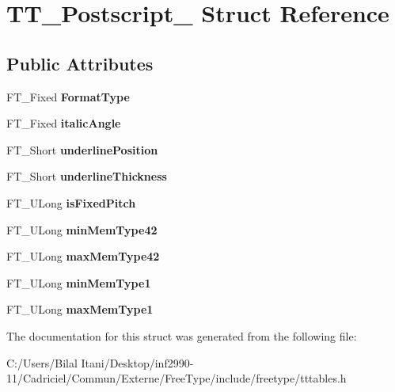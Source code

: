 \hypertarget{struct_t_t___postscript__}{}\section{T\+T\+\_\+\+Postscript\+\_\+ Struct Reference}
\label{struct_t_t___postscript__}
\subsection*{Public Attributes}
\begin{DoxyCompactItemize}
\item 
F\+T\+\_\+\+Fixed {\bfseries Format\+Type}\hypertarget{struct_t_t___postscript___a5ed6585c01fa4ffc3f8537d58bdd955f}{}\label{struct_t_t___postscript___a5ed6585c01fa4ffc3f8537d58bdd955f}

\item 
F\+T\+\_\+\+Fixed {\bfseries italic\+Angle}\hypertarget{struct_t_t___postscript___adcca36c7fbcbdff00fc8c2884a215830}{}\label{struct_t_t___postscript___adcca36c7fbcbdff00fc8c2884a215830}

\item 
F\+T\+\_\+\+Short {\bfseries underline\+Position}\hypertarget{struct_t_t___postscript___a909fd5064ab7547bb8ed984b5dfe2fe2}{}\label{struct_t_t___postscript___a909fd5064ab7547bb8ed984b5dfe2fe2}

\item 
F\+T\+\_\+\+Short {\bfseries underline\+Thickness}\hypertarget{struct_t_t___postscript___a4e4654766a4f27054c9a35958515e186}{}\label{struct_t_t___postscript___a4e4654766a4f27054c9a35958515e186}

\item 
F\+T\+\_\+\+U\+Long {\bfseries is\+Fixed\+Pitch}\hypertarget{struct_t_t___postscript___ab9a537994be4f81cb35f61f83cd97949}{}\label{struct_t_t___postscript___ab9a537994be4f81cb35f61f83cd97949}

\item 
F\+T\+\_\+\+U\+Long {\bfseries min\+Mem\+Type42}\hypertarget{struct_t_t___postscript___ad78af4931654c197d4a8d0f04d473885}{}\label{struct_t_t___postscript___ad78af4931654c197d4a8d0f04d473885}

\item 
F\+T\+\_\+\+U\+Long {\bfseries max\+Mem\+Type42}\hypertarget{struct_t_t___postscript___a70c4ba372d04e686208f0fede9885314}{}\label{struct_t_t___postscript___a70c4ba372d04e686208f0fede9885314}

\item 
F\+T\+\_\+\+U\+Long {\bfseries min\+Mem\+Type1}\hypertarget{struct_t_t___postscript___a91a8b40f60e67a1920209e6b08355848}{}\label{struct_t_t___postscript___a91a8b40f60e67a1920209e6b08355848}

\item 
F\+T\+\_\+\+U\+Long {\bfseries max\+Mem\+Type1}\hypertarget{struct_t_t___postscript___a944a3df5127262db0f7ae92868defb99}{}\label{struct_t_t___postscript___a944a3df5127262db0f7ae92868defb99}

\end{DoxyCompactItemize}


The documentation for this struct was generated from the following file\+:\begin{DoxyCompactItemize}
\item 
C\+:/\+Users/\+Bilal Itani/\+Desktop/inf2990-\/11/\+Cadriciel/\+Commun/\+Externe/\+Free\+Type/include/freetype/tttables.\+h\end{DoxyCompactItemize}
